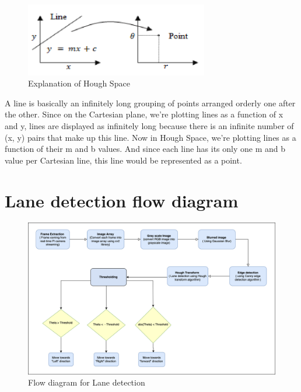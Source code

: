 \begin{figure}[h!]
\centering
\includegraphics[width=8cm]{./Figures/graph_lane_detection.png}
\caption{Explanation of Hough Space}
\label{Explanation_of_Hough_Space}
\end{figure}

\par A line is basically an infinitely long grouping of points arranged orderly one after the other. Since on the Cartesian plane, we’re plotting lines as a function of x and y, lines are displayed as infinitely long because there is an infinite number of (x, y) pairs that make up this line.
Now in Hough Space, we’re plotting lines as a function of their m and b values. And since each line has its only one m and b value per Cartesian line, this line would be represented as a point. 

\section{Lane detection flow diagram}
\begin{figure}[h!]
\centering
\includegraphics[width=\columnwidth]{./Figures/lane_detection.png}
\caption{Flow diagram for Lane detection}
\label{Flow_diagram_for_Lane_detection}
\end{figure}

